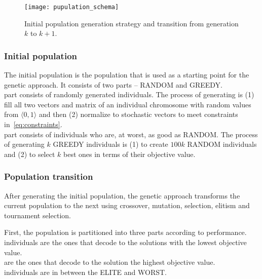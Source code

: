 \begin{figure}[!htp]
    \texttt{[image: pupulation\_schema]}
    \caption[Initial population generation strategy and transition]
    {Initial population generation strategy and transition from generation $k$ to $k+1$.}
    \label{fig:population-schema}
\end{figure}

\subsubsection*{Initial population}
The initial population is the population that is used as a starting point for the genetic approach.
It consists of two parts – RANDOM and GREEDY. \\

 part consists of randomly generated individuals.
The process of generating is (1) fill all two vectors and matrix of an individual chromosome with random values from $\langle 0,1 \rangle$
and then (2) normalize to stochastic vectors to meet constraints in~\ref{eq:constraints}.\\

 part consists of individuals who are, at worst, as good as RANDOM.
The process of generating $k$ GREEDY individuals is (1) to create $100k$ RANDOM individuals and (2) to select $k$ best ones
in terms of their objective value.\\


\subsubsection*{Population transition}
After generating the initial population, the genetic approach transforms the current population
to the next using crossover, mutation, selection, elitism and tournament selection.

First, the population is partitioned into three parts according to performance.\\

 individuals are the ones that decode to the solutions with the lowest objective value.\\

 are the ones that decode to the solution the highest objective value.\\

 individuals are in between the ELITE and WORST.\\

